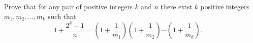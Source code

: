 Prove that for any pair of positive integers $k$ and $n$ there exist $k$ positive integers $m_1, m_2, \ldots, m_k$ such that
\[ 1 + \frac{2^k - 1}{n} = \left(1 + \frac{1}{m_1}\right)\left(1 + \frac{1}{m_2}\right)\cdots\left(1 + \frac{1}{m_k}\right). \]
